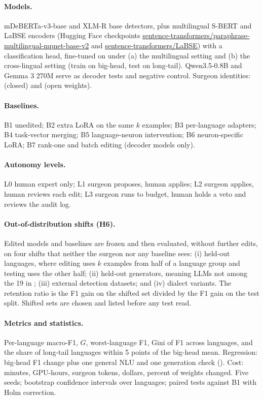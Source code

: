 \documentclass[11pt]{article}
\begin{document}
\paragraph{Models.} mDeBERTa-v3-base and XLM-R base detectors, plus multilingual S-BERT \citep{reimers2020making} and LaBSE \citep{feng2022labse} encoders (Hugging Face checkpoints \url{sentence-transformers/paraphrase-multilingual-mpnet-base-v2} and \url{sentence-transformers/LaBSE}) with a classification head, fine-tuned on \bluff{} under (a) the multilingual setting and (b) the cross-lingual setting (train on big-head, test on long-tail). Qwen3.5-0.8B and Gemma 3 270M serve as decoder tests and negative control. Surgeon identities: \xx{} (closed) and \xx{} (open weights).

\paragraph{Baselines.} B1 unedited; B2 extra LoRA on the same $k$ examples; B3 per-language adapters; B4 task-vector merging; B5 language-neuron intervention; B6 neuron-specific LoRA; B7 rank-one and batch editing (decoder models only).

\paragraph{Autonomy levels.} L0 human expert only; L1 surgeon proposes, human applies; L2 surgeon applies, human reviews each edit; L3 surgeon runs to budget, human holds a veto and reviews the audit log.

\paragraph{Out-of-distribution shifts (H6).} Edited models and baselines are frozen and then evaluated, without further edits, on four shifts that neither the surgeon nor any baseline sees: (i) held-out languages, where editing uses $k$ examples from half of a language group and testing uses the other half; (ii) held-out generators, meaning LLMs not among the 19 in \bluff{}; (iii) \xx{} external detection datasets; and (iv) dialect variants. The retention ratio is the F1 gain on the shifted set divided by the F1 gain on the \bluff{} test split. Shifted sets are chosen and listed before any test read.

\paragraph{Metrics and statistics.} Per-language macro-F1, $G$, worst-language F1, Gini of F1 across languages, and the share of long-tail languages within 5 points of the big-head mean. Regression: big-head F1 change plus one general NLU and one generation check (\xx{}). Cost: minutes, GPU-hours, surgeon tokens, dollars, percent of weights changed. Five seeds; bootstrap confidence intervals over languages; paired tests against B1 with Holm correction.
\end{document}
